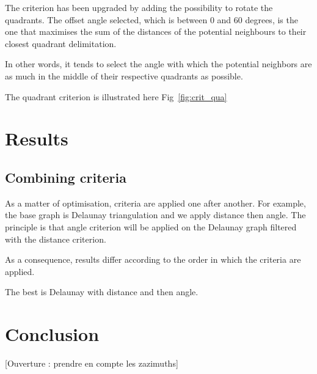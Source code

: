 \documentclass[lettersize,journal,english]{IEEEtran}
\begin{document}
The criterion has been upgraded by adding the possibility to rotate the quadrants. The offset angle selected, which is between 0 and 
60 degrees, is the one that maximises the sum of the distances of the potential neighbours to their closest quadrant delimitation.

In other words, it tends to select the angle with which the potential neighbors are as much in the middle of their respective quadrants
as possible.

The quadrant criterion is illustrated here Fig~\ref{fig:crit_qua}

\section{Results}

\subsection{Combining criteria}
As a matter of optimisation, criteria are applied one after another. For example, the base graph is Delaunay triangulation and we apply distance then angle.
The principle is that angle criterion will be applied on the Delaunay graph filtered with the distance criterion.

As a consequence, results differ according to the order in which the criteria are applied.

The best is Delaunay with distance and then angle.

\section{Conclusion}

[Ouverture : prendre en compte les zazimuths]

\printglossary[type=\acronymtype]
\printglossary



\end{document}
